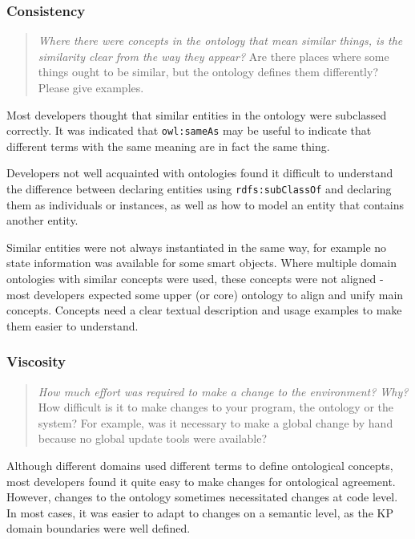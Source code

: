 \subsubsection{Consistency}

\begin{quote}
	\emph{Where there were concepts in the ontology that mean similar things, is the similarity clear from the way they appear?}
	Are there places where some things ought to be similar, but the ontology defines them differently? Please give examples.
\end{quote}

Most developers thought that similar entities in the ontology were subclassed correctly. It was indicated that \texttt{owl:sameAs} may be useful to indicate that different terms with the same meaning are in fact the same thing.

Developers not well acquainted with ontologies found it difficult to understand the difference between declaring entities using \texttt{rdfs:sub\-Class\-Of} and declaring them as individuals or instances, as well as how to model an entity that contains another entity.

Similar entities were not always instantiated in the same way, for example no state information was available for some smart objects.
Where multiple domain ontologies with similar concepts were used, these concepts were not aligned - most developers expected some upper (or core) ontology to align and unify main concepts.
Concepts need a clear textual description and usage examples to make them easier to understand.

\subsubsection{Viscosity}

\begin{quote}
	\emph{How much effort was required to make a change to the environment? Why?}
	How difficult is it to make changes to your program, the ontology or the system? For example, was it necessary to make a global change by hand because no global update tools were available?
\end{quote}

Although different domains used different terms to define ontological concepts, most developers found it quite easy to make changes for ontological agreement. However, changes to the ontology sometimes necessitated changes at code level. In most cases, it was easier to adapt to changes on a semantic level, as the \ac{KP} domain boundaries were well defined.

